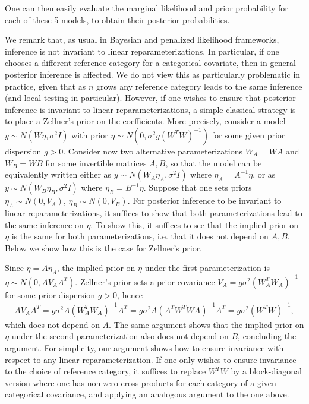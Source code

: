 One can then easily evaluate the marginal likelihood and prior probability for each of these 5 models, to obtain their posterior probabilities.

We remark that, as usual in Bayesian and penalized likelihood frameworks, inference is not invariant to linear reparameterizations. In particular, if one chooses a different reference category for a categorical covariate, then in general posterior inference is affected. We do not view this as particularly problematic in practice, given that as $n$ grows any reference category leads to the same inference (and local testing in particular). However, if one wishes to ensure that posterior inference is invariant to linear reparameterizations, a simple classical strategy is to place a Zellner's prior on the coefficients. 
More precisely, consider a model $y \sim N(W\eta, \sigma^2 I)$ with prior $\eta \sim N(0, \sigma^2 g (W^TW)^{-1})$ for some given prior dispersion $g>0$. 
Consider now two alternative parameterizations $W_A= W A$ and $W_B= W B$ for some invertible matrices $A,B$,  so that the model can be equivalently written either as $y \sim N(W_A \eta_A, \sigma^2 I)$ where $\eta_A= A^{-1} \eta$, or as $y \sim N(W_B \eta_B, \sigma^2 I)$ where $\eta_B= B^{-1} \eta$.
Suppose that one sets priors $\eta_A \sim N(0, V_A)$, $\eta_B \sim N(0, V_B)$. 
For posterior inference to be invariant to linear reparameterizations, it suffices to show that both parameterizations lead to the same inference on $\eta$. To show this, it suffices to see that the implied prior on $\eta$ is the same for both parameterizations, i.e. that it does not depend on $A,B$. Below we show how this is the case for Zellner's prior.

Since $\eta= A \eta_A$, the implied prior on $\eta$ under the first parameterization is $\eta \sim N(0, A V_A A^T)$. 
Zellner's prior sets a prior covariance $V_A= g \sigma^2 (W_A^T W_A)^{-1}$ for some prior dispersion $g > 0$, hence
\begin{align}
A V_A A^T= g \sigma^2 A (W_A^T W_A)^{-1} A^T= g \sigma^2 A (A^T W^T W A)^{-1} A^T= g \sigma^2 (W^T W)^{-1},
\nonumber
\end{align}
which does not depend on $A$. The same argument shows that the implied prior on $\eta$ under the second parameterization also does not depend on $B$, concluding the argument.
For simplicity, our argument shows how to ensure invariance with respect to any linear reparameterization. If one only wishes to ensure invariance to the choice of reference category, it suffices to replace $W^TW$ by a block-diagonal version where one has non-zero cross-products for each category of a given categorical covariance, and applying an analogous argument to the one above.




